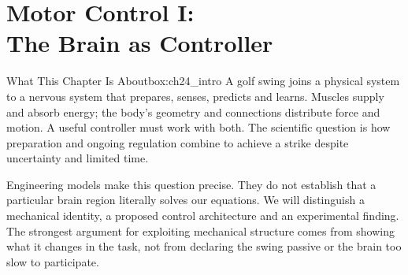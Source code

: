 \chapter[Motor Control I: The Brain as Controller]{Motor Control I:\\The Brain as Controller}
\label{ch:motor_control_brain}
\raggedbottom

\begin{laymansbox}{What This Chapter Is About}{box:ch24_intro}
A golf swing joins a physical system to a nervous system that prepares, senses, predicts and learns. Muscles supply and absorb energy; the body's geometry and connections distribute force and motion. A useful controller must work with both. The scientific question is how preparation and ongoing regulation combine to achieve a strike despite uncertainty and limited time.

Engineering models make this question precise. They do not establish that a particular brain region literally solves our equations. We will distinguish a mechanical identity, a proposed control architecture and an experimental finding. The strongest argument for exploiting mechanical structure comes from showing what it changes in the task, not from declaring the swing passive or the brain too slow to participate.
\end{laymansbox}

